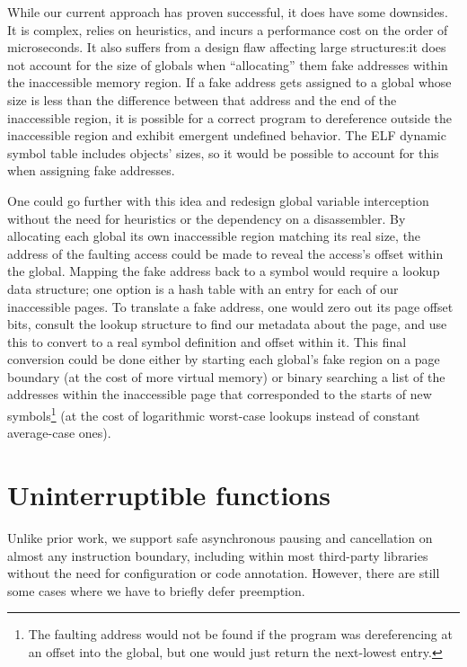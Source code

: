 While our current approach has proven successful, it does have some downsides.  It is
complex, relies on heuristics, and incurs a performance cost on the order of
microseconds.  It also suffers from a design flaw affecting large structures:\@ it
does not account for the size of globals when ``allocating'' them fake addresses
within the inaccessible memory region.  If a fake address gets assigned to a global
whose size is less than the difference between that address and the end of the
inaccessible region, it is possible for a correct program to dereference outside the
inaccessible region and exhibit emergent undefined behavior.  The ELF dynamic symbol
table includes objects' sizes, so it would be possible to account for this when
assigning fake addresses.

One could go further with this idea and redesign global variable interception without
the need for heuristics or the dependency on a disassembler.  By allocating each
global its own inaccessible region matching its real size, the address of the
faulting access could be made to reveal the access's offset within the global.
Mapping the fake address back to a symbol would require a lookup data structure; one
option is a hash table with an entry for each of our inaccessible pages.  To
translate a fake address, one would zero out its page offset bits, consult the lookup
structure to find our metadata about the page, and use this to convert to a real
symbol definition and offset within it.  This final conversion could be done either
by starting each global's fake region on a page boundary (at the cost of more virtual
memory) or binary searching a list of the addresses within the inaccessible page that
corresponded to the starts of new symbols\footnote{The faulting address would not be
found if the program was dereferencing at an offset into the global, but one would
just return the next-lowest entry.} (at the cost of logarithmic worst-case lookups
instead of constant average-case ones).


\section{Uninterruptible functions}
\label{sec:libgotcha:unint}

Unlike prior work, we support safe asynchronous pausing and cancellation on almost
any instruction boundary, including within most third-party libraries without
the need for configuration or code annotation.  However, there are still some cases
where we have to briefly defer preemption.

